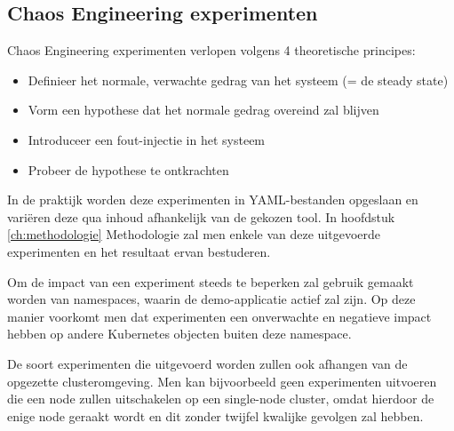 \subsection{Chaos Engineering experimenten}

Chaos Engineering experimenten verlopen volgens 4 theoretische principes: 
\begin{itemize}
    \item Definieer het normale, verwachte gedrag van het systeem (= de steady state)
    \item Vorm een hypothese dat het normale gedrag overeind zal blijven 
    \item Introduceer een fout-injectie in het systeem
    \item Probeer de hypothese te ontkrachten
\end{itemize}

In de praktijk worden deze experimenten in YAML-bestanden opgeslaan en variëren deze qua inhoud afhankelijk van de gekozen tool. In hoofdstuk \ref{ch:methodologie} Methodologie zal men enkele van deze uitgevoerde experimenten en het resultaat ervan bestuderen.

Om de impact van een experiment steeds te beperken zal gebruik gemaakt worden van namespaces, waarin de demo-applicatie actief zal zijn. Op deze manier voorkomt men dat experimenten een onverwachte en negatieve impact hebben op andere Kubernetes objecten buiten deze namespace.

De soort experimenten die uitgevoerd worden zullen ook afhangen van de opgezette clusteromgeving. Men kan bijvoorbeeld geen experimenten uitvoeren die een node zullen uitschakelen op een single-node cluster, omdat hierdoor de enige node geraakt wordt en dit zonder twijfel kwalijke gevolgen zal hebben.    

